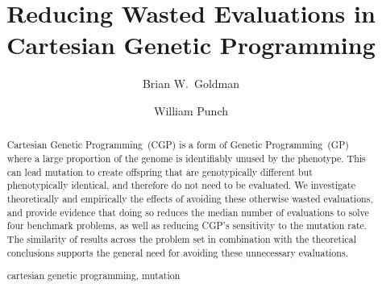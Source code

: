 \documentclass[runningheads,a4paper]{llncs}
\newcommand{\keywords}[1]{\par\addvspace\baselineskip
\noindent\keywordname\enspace\ignorespaces#1}
\begin{document}
\mainmatter  %

\title{Reducing Wasted Evaluations in Cartesian Genetic Programming}


%
%
\author{Brian W.~Goldman\and William Punch}
%



%
%

\maketitle


\begin{abstract}
Cartesian Genetic Programming~(CGP) is a form of Genetic Programming~(GP)
where a large proportion of the genome is identifiably unused
by the phenotype.  This can lead mutation to create offspring that are 
genotypically different but phenotypically identical, and therefore do
not need to be evaluated.  We investigate theoretically and empirically
the effects of avoiding these otherwise wasted evaluations, and provide
evidence that doing so reduces the median number of evaluations to solve
four benchmark problems, as well as reducing CGP's sensitivity to the mutation
rate.  The similarity of results across the problem set in combination with the
theoretical conclusions supports the general need for avoiding these unnecessary
evaluations.


\keywords{cartesian genetic programming, mutation}
\end{abstract}
\end{document}
